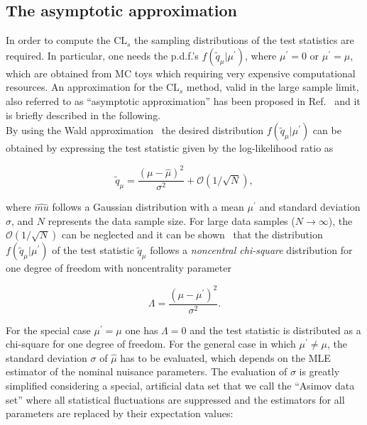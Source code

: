 \subsection{The asymptotic approximation}\label{subsec:AsymptCLs}

In order to compute the $\mathrm{CL}_s$ the sampling distributions of the test statistics are required.
In particular, one needs the p.d.f.'s $f(\tilde{q}_\mu|\mu^\prime)$, where $\mu^\prime = 0$ or $\mu^\prime = \mu$,
which are obtained from MC toys which requiring very expensive computational resources.
An approximation for the $\mathrm{CL}_s$ method, valid in the large sample limit, also referred to as ``asymptotic approximation'' has been proposed in Ref.~\cite{AsymptCLs}
and it is briefly described in the following.\\

By using the Wald approximation~\cite{10.2307/1990256} the desired distribution $f(\tilde{q}_\mu|\mu^\prime)$ can be obtained by expressing the test statistic given by the log-likelihood ratio as

\begin{equation}
\tilde{q}_\mu = \frac{(\mu-\hat{\mu})^2}{\sigma^2} + \mathcal{O}(1/\sqrt{N}),
\end{equation}

where $\hat{mu}$ follows a Gaussian distribution with a mean $\mu^\prime$ and standard deviation $\sigma$, and $N$ represents the data sample size.
For large data samples ($N\rightarrow\infty$), the $\mathcal{O}(1/\sqrt{N})$ can be neglected and it can be shown~\cite{wilks1938} that the distribution $f(\tilde{q}_\mu|\mu^\prime)$ of the test statistic $\tilde{q}_\mu$
follows a {\itshape noncentral chi-square} distribution for one degree of freedom with noncentrality parameter

\begin{equation}
\Lambda = \frac{(\mu-\mu^\prime)^2}{\sigma^2}.
\end{equation}

For the special case $\mu^\prime = \mu$ one has $\Lambda = 0$ and the test statistic is distributed as a chi-square for one degree of freedom.
For the general case in which $\mu^\prime \neq \mu$, the standard deviation $\sigma$ of $\hat{\mu}$ has to be evaluated, which depends on the MLE estimator of the nominal nuisance parameters.
The evaluation of $\sigma$ is greatly simplified considering a special, artificial data set that we call the ``Asimov data set'' where all statistical fluctuations are suppressed and the estimators for all parameters
are replaced by their expectation values:

